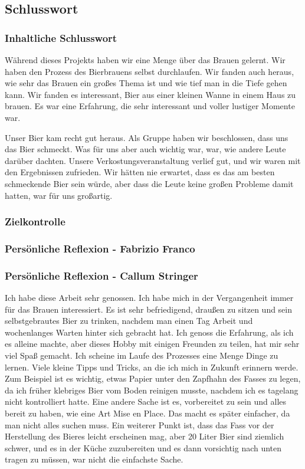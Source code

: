 \subsection{Schlusswort}
\subsubsection{Inhaltliche Schlusswort}
Während dieses Projekts haben wir eine Menge über das Brauen gelernt. Wir haben den Prozess des Bierbrauens selbst durchlaufen. Wir fanden auch heraus, wie sehr das Brauen ein großes Thema ist und wie tief man in die Tiefe gehen kann. Wir fanden es interessant, Bier aus einer kleinen Wanne in einem Haus zu brauen. Es war eine Erfahrung, die sehr interessant und voller lustiger Momente war. 

Unser Bier kam recht gut heraus.
 Als Gruppe haben wir beschlossen, dass uns das Bier schmeckt. 
 Was für uns aber auch wichtig war, war, wie andere Leute darüber dachten.
  Unsere Verkostungsveranstaltung verlief gut, und wir waren mit den Ergebnissen zufrieden.
   Wir hätten nie erwartet, dass es das am besten schmeckende Bier sein würde, aber dass die Leute 
   keine großen Probleme damit hatten, war für uns großartig.

\subsubsection{Zielkontrolle}
\subsubsection{Persönliche Reflexion - Fabrizio Franco}
\subsubsection{Persönliche Reflexion - Callum Stringer}
Ich habe diese Arbeit sehr genossen. Ich habe mich in der Vergangenheit immer für das Brauen interessiert. Es ist sehr befriedigend, draußen zu sitzen und sein selbstgebrautes Bier zu trinken, nachdem man einen Tag Arbeit und wochenlanges Warten hinter sich gebracht hat.
Ich genoss die Erfahrung, als ich es alleine machte, aber dieses Hobby mit einigen Freunden zu teilen, hat mir sehr viel Spaß gemacht.
Ich scheine im Laufe des Prozesses eine Menge Dinge zu lernen. Viele kleine Tipps und Tricks, an die ich mich in Zukunft erinnern werde.
Zum Beispiel ist es wichtig, etwas Papier unter den Zapfhahn des Fasses zu legen, da ich früher klebriges Bier vom Boden reinigen musste,
nachdem ich es tagelang nicht kontrolliert hatte.
Eine andere Sache ist es, vorbereitet zu sein und alles bereit zu haben, wie eine Art Mise en Place. Das macht es später einfacher, da man
nicht alles suchen muss.
Ein weiterer Punkt ist, dass das Fass vor der Herstellung des Bieres leicht erscheinen mag, aber 20 Liter Bier sind ziemlich schwer,
und es in der Küche zuzubereiten und es dann vorsichtig nach unten tragen zu müssen, war nicht die einfachste Sache.

